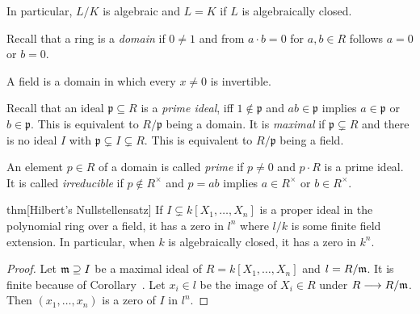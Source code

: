 \documentclass[a4paper,parskip=half,numbers=enddot, DIV=12]{scrreprt}
\begin{document}
	\begin{rem}
		In particular, $L/K$ is algebraic and $L=K$ if $L$ is algebraically closed.
	\end{rem}
	\begin{rem}
		\begin{alphanumerate}
			\item Recall that a ring is a \emph{domain} if $0\neq 1$ and from $a\cdot b =0$ for $a,b\in R$ follows $a=0$ or $b=0$.
			\item  A field is a domain in which every $x\neq 0$ is invertible.
			\item Recall that an ideal $\mathfrak{p}\subseteq R$ is a \emph{prime ideal}, iff $1\not\in\mathfrak{p}$ and $ab\in \mathfrak{p}$ implies $a\in \mathfrak{p}$ or $b\in \mathfrak{p}$. This is equivalent to $R/\mathfrak{p}$ being a domain. It is \emph{maximal} if $\mathfrak{p}\subsetneq R$ and there is no ideal $I$ with $\mathfrak{p}\subsetneq I\subsetneq R$. This is equivalent to $R/\mathfrak{p}$ being a field.
			\item An element $p\in R$ of a domain is called \emph{prime} if $p\neq 0$ and $p\cdot R$ is a prime ideal. It is called \emph{irreducible} if $p\not\in R^\times$ and $p=ab$ implies $a\in R^\times$ or $b\in R^\times$.
		\end{alphanumerate}
		
	\end{rem}
	
	\begin{varthm}{thm}[Hilbert's Nullstellensatz]
		If $I\subsetneq k[X_1,\ldots, X_n]$ is a proper ideal in the polynomial ring over a field, it has a zero in $l^n$ where $l/k$ is some finite field extension. In particular, when $k$ is algebraically closed, it has a zero in $k^n$.
	\end{varthm}
	\begin{proof}
		Let $\mathfrak{m}\supseteq I$ be a maximal ideal of $R=k[X_1,\ldots,X_n]$ and $l=R/\mathfrak{m}$. It is finite because of Corollary~. Let $x_i\in l$ be the image of $X_i\in R$ under $R\longrightarrow R/\mathfrak{m}$. Then $(x_1,\ldots,x_n)$ is a zero of $I$ in $l^n$.
	\end{proof}
	
\end{document}
